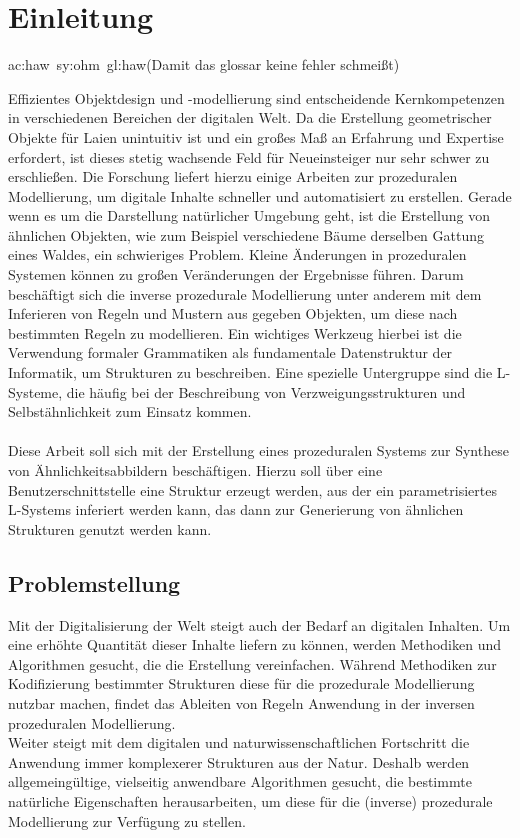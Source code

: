 
\chapter{Einleitung}

\gls{ac:haw}~\gls{sy:ohm}~\gls{gl:haw}(Damit das glossar keine fehler schmeißt)

Effizientes Objektdesign und -modellierung sind entscheidende Kernkompetenzen in verschiedenen Bereichen der
digitalen Welt.
Da die Erstellung geometrischer Objekte für Laien unintuitiv ist und ein großes Maß an Erfahrung und Expertise
erfordert, ist dieses stetig wachsende Feld für Neueinsteiger nur sehr schwer zu erschließen.
Die Forschung liefert hierzu einige Arbeiten zur prozeduralen Modellierung, um digitale Inhalte schneller
und automatisiert zu erstellen.
Gerade wenn es um die Darstellung natürlicher Umgebung geht, ist die Erstellung von ähnlichen Objekten, wie
zum Beispiel verschiedene Bäume derselben Gattung eines Waldes, ein schwieriges Problem.
Kleine Änderungen in prozeduralen Systemen können zu großen Veränderungen der Ergebnisse führen.
Darum beschäftigt sich die inverse prozedurale Modellierung unter anderem mit dem Inferieren von Regeln
und Mustern aus gegeben Objekten, um diese nach bestimmten Regeln zu modellieren.
Ein wichtiges Werkzeug hierbei ist die Verwendung formaler Grammatiken als fundamentale Datenstruktur
der Informatik, um Strukturen zu beschreiben.
Eine spezielle Untergruppe sind die L-Systeme, die häufig bei der Beschreibung
von Verzweigungsstrukturen und Selbstähnlichkeit zum Einsatz kommen.
\\~\\
Diese Arbeit soll sich mit der Erstellung eines prozeduralen Systems zur Synthese von Ähnlichkeitsabbildern
beschäftigen.
Hierzu soll über eine Benutzerschnittstelle eine Struktur erzeugt werden, aus der ein parametrisiertes L-Systems
inferiert werden kann, das dann zur Generierung von ähnlichen Strukturen genutzt werden kann.

\newpage

\section{Problemstellung}

Mit der Digitalisierung der Welt steigt auch der Bedarf an digitalen Inhalten.
Um eine erhöhte Quantität dieser Inhalte liefern zu können, werden Methodiken und Algorithmen gesucht, die die Erstellung
vereinfachen.
Während Methodiken zur Kodifizierung bestimmter Strukturen diese für die prozedurale Modellierung nutzbar machen,
findet das Ableiten von Regeln Anwendung in der inversen prozeduralen Modellierung.\\
Weiter steigt mit dem digitalen und naturwissenschaftlichen Fortschritt die Anwendung immer komplexerer Strukturen aus
der Natur.
Deshalb werden allgemeingültige, vielseitig anwendbare Algorithmen gesucht, die bestimmte natürliche Eigenschaften
herausarbeiten, um diese für die (inverse) prozedurale Modellierung zur Verfügung zu stellen.\\


